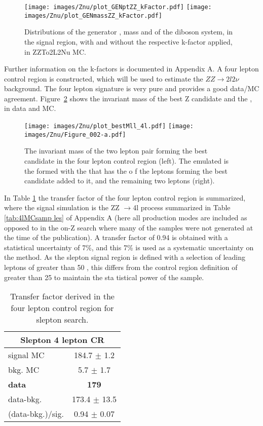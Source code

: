 \begin{figure}[htbp!]
\begin{center}
\texttt{[image: images/Znu/plot\_GENptZZ\_kFactor.pdf]}
\texttt{[image: images/Znu/plot\_GENmassZZ\_kFactor.pdf]}
\caption{Distributions of the generator \pt, mass and \dphi of the diboson system, in the signal region, with and without the respective k-factor applied, in ZZTo2L2Nu MC.}
\label{kfactor}
\end{center}
\end{figure}
Further information on the k-factors is documented in Appendix A.
A four lepton control region is constructed, which will be used to estimate the $ZZ\rightarrow 2l2\nu$ background. The four lepton signature is very pure and provides a good data/MC agreement.
Figure~\ref{fig:ZZslepton} shows the invariant mass of the best Z candidate and the \mttwo, in data and MC.
\begin{figure}[htbp!]
\begin{center}
\texttt{[image: images/Znu/plot\_bestMll\_4l.pdf]}
\texttt{[image: images/Znu/Figure\_002-a.pdf]}
\caption{The invariant mass of the two lepton pair forming the best \PZ candidate in the four lepton control region (left). The emulated \mttwo is the \mttwo formed with the \ptmiss that has the \pt o    f the leptons forming the best \PZ candidate added to it, and the remaining two leptons (right).}
\label{fig:ZZslepton}
\end{center}
\end{figure}
In Table \ref{tab:tab4lcontrol} the transfer factor of the four lepton control region is summarized, where the signal simulation is the ZZ $\rightarrow$4l process summarized in Table \ref{tab:4lMCsamp    les} of Appendix A (here all production modes are included as opposed to in the on-Z search where many of the samples were not generated at the time of the publication).
A transfer factor of 0.94 is obtained with a statistical uncertainty of 7\%, and this 7\% is used as a systematic uncertainty on the method. 
As the slepton signal region is defined with a selection of leading leptons of \pt greater than 50 \GeV, this differs from the control region definition of \pt greater than 25 \GeV to maintain the sta    tistical power of the sample. 
\begin{table}[ht!]
\def\arraystretch{1.2}
\setlength{\belowcaptionskip}{6pt}
\small                
\centering                        
\caption{Transfer factor derived in the four lepton control region for slepton search.}
\label{tab:tab4lcontrol}          
\begin{tabular}{l c }
\hline \hline
\multicolumn{2}{c}{Slepton 4 lepton CR}  \\\hline
signal MC        & 184.7     $\pm$  1.2    \\
bkg. MC          & 5.7  $\pm$  1.7\\ \hline
\textbf{data}       & \textbf{179}  \\
data-bkg.        &  173.4   $\pm$  13.5 \\ \hline
(data-bkg.)/sig. & 0.94   $\pm$  0.07\\\hline\hline
\end{tabular}    
\end{table}

